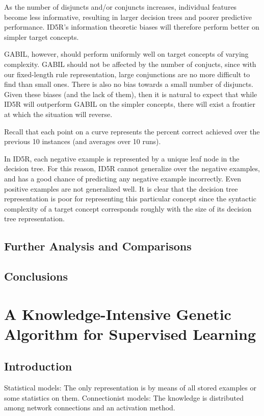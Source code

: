 \documentclass[12pt]{book}
\begin{document}
As the number of disjuncts and/or conjuncts increases, individual features become less informative, resulting in larger decision trees and poorer predictive performance. ID5R's information theoretic biases will therefore perform better on simpler target concepts.

GABIL, however, should perform uniformly well on target concepts of varying complexity. GABIL should not be affected by the number of conjucts, since with our fixed-length rule representation, large conjunctions are no more difficult to find than small ones. There is also no bias towards a small number of disjuncts. Given these biases (and the lack of them), then it is natural to expect that while ID5R will outperform GABIL on the simpler concepts, there will exist a frontier at which the situation will reverse.

Recall that each point on a curve represents the percent correct achieved over the previous 10 instances (and averages over 10 runs).

In ID5R, each negative example is represented by a unique leaf node in the decision tree. For this reason, ID5R cannot generalize over the negative examples, and has a good chance of predicting any negative example incorrectly. Even positive examples are not generalized well. It is clear that the decision tree representation is poor for representing this particular concept since the syntactic complexity of a target concept corresponds roughly with the size of its decision tree representation.

\section{Further Analysis and Comparisons}

\section{Conclusions}
\clearpage

\chapter{A Knowledge-Intensive Genetic Algorithm for Supervised Learning}

\section{Introduction}
Statistical models: The only representation is by means of all stored examples or some statistics on them. Connectionist models: The knowledge is distributed among network connections and an activation method.
\end{document}
